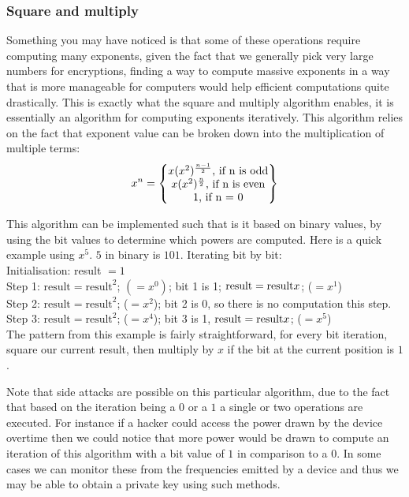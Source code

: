 \documentclass[conference]{IEEEtran}
\begin{document}
\subsubsection*{Square and multiply}
Something you may have noticed is that some of these operations require 
computing many exponents, given the fact that we generally pick very large 
numbers for encryptions, finding a way to compute massive exponents 
in a way that is more manageable for computers would help efficient computations 
quite drastically. This is exactly what the square and multiply algorithm
enables, it is essentially an algorithm for computing exponents iteratively.
This algorithm relies on the fact that exponent value can be broken down into
the multiplication of multiple terms:
\begin{equation*}
    x^{n} =    
    \begin{Bmatrix} 
        x\*(x^{2})^{\frac{n - 1}{2}} \textrm{, if n is odd} \\
        x\*(x^{2})^{\frac{n}{2}} \textrm{, if n is even} \\  
        1 \textrm{, if n = 0} \\  

     \end{Bmatrix}
\end{equation*}


This algorithm can be implemented such that is it based on 
binary values, by using the bit values to determine which 
powers are computed.
Here is a quick example using $x^5$. $5$ in binary is $101$.
Iterating bit by bit: \\
Initialisation: result $= 1$ \\
Step 1: $\textrm{result}=\textrm{result}^2$; $(= x^0)$; bit 1 is 1; $\textrm{result} = \textrm{result}\*x$; ($= x^1$) \\
Step 2: $\textrm{result}=\textrm{result}^2$; ($= x^2$); bit 2 is 0, so there is no computation this step. \\
Step 3: $\textrm{result}=\textrm{result}^2$; ($= x^4$); bit 3 is 1, $\textrm{result} = \textrm{result}\*x$; ($= x^5$) \\

The pattern from this example is fairly straightforward, for every bit iteration, 
square our current result, then multiply by $x$ if the bit at the current position is $1$.


Note that side attacks are possible on this particular algorithm, due to 
the fact that based on the iteration being a $0$ or a $1$ a single or two
operations are executed. For instance if a hacker could access the power drawn
by the device overtime then we could notice that more power would be drawn to
compute an iteration of this algorithm with a bit value of $1$ in comparison to 
a $0$. In some cases we can monitor these from the frequencies emitted by a device
and thus we may be able to obtain a private key using such methods.
\end{document}
